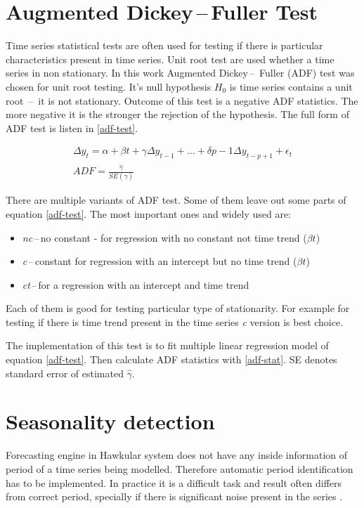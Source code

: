     \section{Augmented Dickey\,--\,Fuller Test}
    Time series statistical tests are often used for testing if there is particular characteristics present in time
    series. Unit root test are used whether a time series in non stationary. In this work Augmented Dickey\,--\,
    Fuller (ADF) test was chosen for unit root testing. It's null hypothesis $H_0$ is time series contains a
    unit root \,--\, it is not stationary. Outcome of this test is a negative ADF statistics. The more negative it is
    the stronger the rejection of the hypothesis. The full form of ADF test is listen in \ref{adf-test}.

    \begin{eqnarray} \label{adf-test}
        \Delta y_t = \alpha + \beta t + \gamma \Delta y_{t-1} + \dots + \delta{p-1} \Delta y_{t-p+1} + \epsilon_t \\
        ADF = \frac{\hat{\gamma}}{SE(\hat{\gamma})} \label{adf-stat}
    \end{eqnarray}

    There are multiple variants of ADF test. Some of them leave out some parts of equation \ref{adf-test}.
    The most important ones and widely used are:

    \begin{itemize}
        \item \emph{nc}\,--\,no constant - for regression with no constant not time trend ($\beta t$)
        \item \emph{c}\,--\,constant for regression with an intercept but no time trend ($\beta t$)
        \item \emph{ct}\,--\,for a regression with an intercept and time trend
    \end{itemize}

    Each of them is good for testing particular type of stationarity. For example for testing if there is time trend
    present in the time series \emph{c} version is best choice.

    The implementation of this test is to fit multiple linear regression model of equation \ref{adf-test}. Then
    calculate ADF statistics with \ref{adf-stat}. SE denotes standard error of estimated $\hat{\gamma}$.

    \section{Seasonality detection}
    Forecasting engine in Hawkular system does not have any inside information of period of a time series being
    modelled. Therefore automatic period identification has to be implemented. In practice it is
    a difficult task and result often differs from correct period, specially if there is significant noise present in
    the series \cite{period-meteo}.

